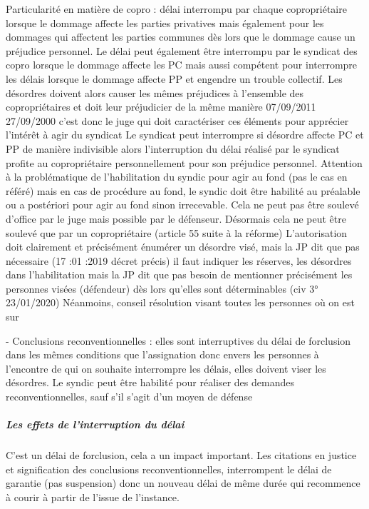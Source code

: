 					Particularité en matière de copro : délai interrompu par chaque copropriétaire lorsque le dommage affecte les parties privatives mais également pour les dommages qui affectent les parties communes dès lors que le dommage cause un préjudice personnel. Le délai peut également être interrompu par le syndicat des copro lorsque le dommage affecte les PC mais aussi compétent pour interrompre les délais lorsque le dommage affecte PP et engendre un trouble collectif. Les désordres doivent alors causer les mêmes préjudices à l’ensemble des copropriétaires et doit leur préjudicier de la même manière
					07/09/2011 27/09/2000 c’est donc le juge qui doit caractériser ces éléments pour apprécier l’intérêt à agir du syndicat
					Le syndicat peut interrompre si désordre affecte PC et PP de manière indivisible alors l’interruption du délai réalisé par le syndicat profite au copropriétaire personnellement pour son préjudice personnel. Attention à la problématique de l’habilitation du syndic pour agir au fond (pas le cas en référé) mais en cas de procédure au fond, le syndic doit être habilité au préalable ou a postériori pour agir au fond sinon irrecevable. Cela ne peut pas être soulevé d’office par le juge mais possible par le défenseur. Désormais cela ne peut être soulevé que par un copropriétaire (article 55 suite à la réforme) L’autorisation doit clairement et précisément énumérer un désordre visé, mais la JP dit que pas nécessaire (17 :01 :2019 décret précis) il faut indiquer les réserves, les désordres dans l’habilitation mais la JP dit que pas besoin de mentionner précisément les personnes visées (défendeur) dès lors qu’elles sont déterminables (civ 3° 23/01/2020)
					Néanmoins, conseil résolution visant toutes les personnes où on est sur

					-	Conclusions reconventionnelles : elles sont interruptives du délai de forclusion dans les mêmes conditions que l’assignation donc envers les personnes à l’encontre de qui on souhaite interrompre les délais, elles doivent viser les désordres. Le syndic peut être habilité pour réaliser des demandes reconventionnelles, sauf s’il s’agit d’un moyen de défense


				\subparagraph{Les effets de l'interruption du délai}

				C’est un délai de forclusion, cela a un impact important. Les citations en justice et signification des conclusions reconventionnelles, interrompent le délai de garantie (pas suspension) donc un nouveau délai de même durée qui recommence à courir à partir de l’issue de l’instance.

